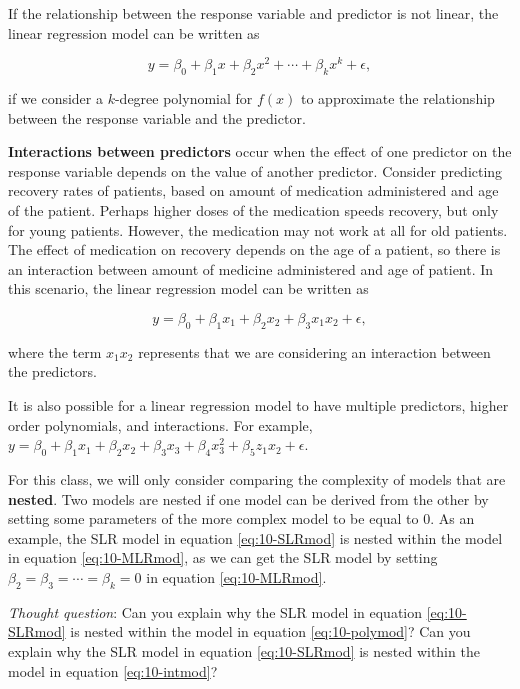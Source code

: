 \documentclass[
]{book}
\begin{document}
If the relationship between the response variable and predictor is not linear, the linear regression model can be written as

\begin{equation} 
y=\beta_0+\beta_{1}x + \beta_2 x^2 + \cdots + \beta_k x^k + \epsilon,
\label{eq:10-polymod}
\end{equation}

if we consider a \(k\)-degree polynomial for \(f(x)\) to approximate the relationship between the response variable and the predictor.

\textbf{Interactions between predictors} occur when the effect of one predictor on the response variable depends on the value of another predictor. Consider predicting recovery rates of patients, based on amount of medication administered and age of the patient. Perhaps higher doses of the medication speeds recovery, but only for young patients. However, the medication may not work at all for old patients. The effect of medication on recovery depends on the age of a patient, so there is an interaction between amount of medicine administered and age of patient. In this scenario, the linear regression model can be written as

\begin{equation} 
y=\beta_0+\beta_{1}x_1 + \beta_2 x_2 + \beta_3 x_1 x_2 + \epsilon,
\label{eq:10-intmod}
\end{equation}

where the term \(x_1 x_2\) represents that we are considering an interaction between the predictors.

It is also possible for a linear regression model to have multiple predictors, higher order polynomials, and interactions. For example, \(y=\beta_0+\beta_{1}x_1 + \beta_2 x_2 + \beta_3 x_3 + \beta_4 x_3^2 + \beta_5 z_1 x_2 + \epsilon\).

For this class, we will only consider comparing the complexity of models that are \textbf{nested}. Two models are nested if one model can be derived from the other by setting some parameters of the more complex model to be equal to 0. As an example, the SLR model in equation \eqref{eq:10-SLRmod} is nested within the model in equation \eqref{eq:10-MLRmod}, as we can get the SLR model by setting \(\beta_2 = \beta_3 = \cdots = \beta_k = 0\) in equation \eqref{eq:10-MLRmod}.

\emph{Thought question}: Can you explain why the SLR model in equation \eqref{eq:10-SLRmod} is nested within the model in equation \eqref{eq:10-polymod}? Can you explain why the SLR model in equation \eqref{eq:10-SLRmod} is nested within the model in equation \eqref{eq:10-intmod}?
\end{document}
